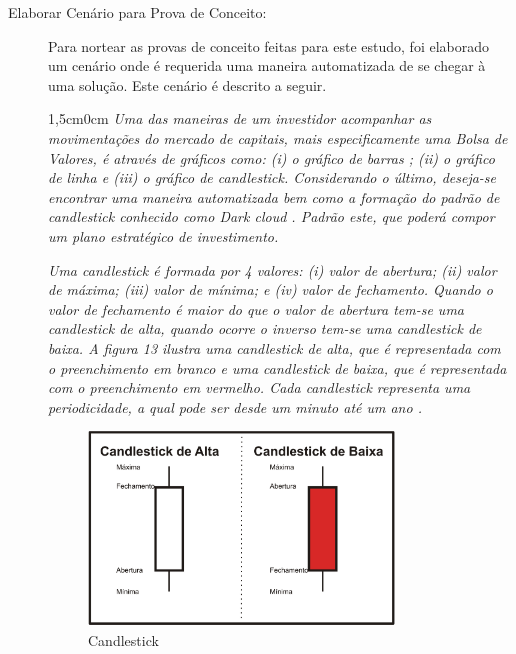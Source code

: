 \begin{description}
\item [Elaborar Cenário para Prova de Conceito:]
Para nortear as provas de conceito feitas para este estudo, foi elaborado um cenário onde é requerida uma maneira automatizada de se chegar à uma solução. Este cenário é descrito a seguir.

\begin{adjustwidth}{1,5cm}{0cm}
\textit{Uma das maneiras de um investidor acompanhar as movimentações do mercado de capitais, mais especificamente uma Bolsa de Valores, é através de gráficos como: (i) o gráfico de barras ; (ii) o gráfico de linha  e (iii) o gráfico de candlestick\cite[p. 5-6]{matsura2006}. Considerando o último, deseja-se encontrar uma maneira automatizada bem como a formação do padrão de candlestick conhecido como Dark cloud \cite[p.61]{matsura2006}. Padrão este, que poderá compor um plano estratégico de investimento.}

\textit{Uma candlestick é formada por 4 valores: (i) valor de abertura; (ii) valor de máxima; (iii) valor de mínima; e (iv) valor de fechamento. Quando o valor de  fechamento é maior do que o valor de abertura tem-se uma candlestick de alta, quando ocorre o inverso tem-se uma candlestick de baixa. A figura 13 ilustra uma candlestick de alta, que é representada com o preenchimento em branco e uma candlestick de baixa, que é representada com o preenchimento em vermelho. Cada candlestick representa uma periodicidade, a qual pode ser desde um minuto até um ano \cite[p.6]{matsura2006}.}
\end{adjustwidth}

\begin{figure}[h!]
\centering
\label{f13} 
\includegraphics[width=0.8\textwidth]{figuras/f10}
\caption{Candlestick }
\end{figure}
\FloatBarrier


\end{description}
